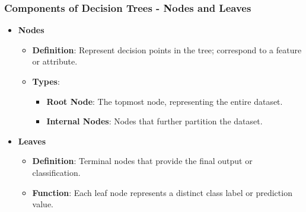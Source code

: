 \documentclass{beamer}
\begin{document}
\begin{frame}[fragile]
    \frametitle{Components of Decision Trees - Nodes and Leaves}
    \begin{itemize}
        \item \textbf{Nodes}
            \begin{itemize}
                \item \textbf{Definition}: Represent decision points in the tree; correspond to a feature or attribute.
                \item \textbf{Types}:
                    \begin{itemize}
                        \item \textbf{Root Node}: The topmost node, representing the entire dataset.
                        \item \textbf{Internal Nodes}: Nodes that further partition the dataset.
                    \end{itemize}
            \end{itemize}
        \item \textbf{Leaves}
            \begin{itemize}
                \item \textbf{Definition}: Terminal nodes that provide the final output or classification.
                \item \textbf{Function}: Each leaf node represents a distinct class label or prediction value.
            \end{itemize}
    \end{itemize}
\end{frame}
\end{document}
